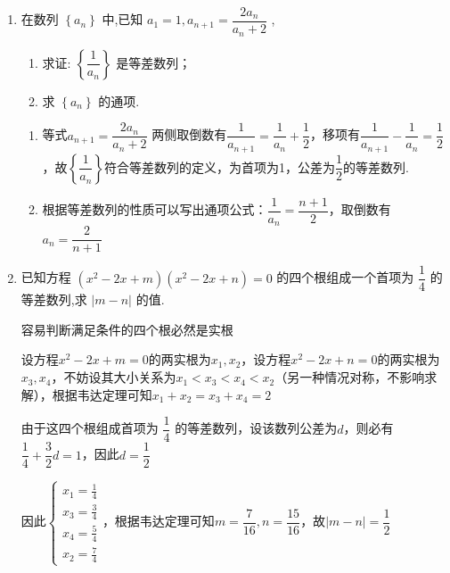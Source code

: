 \begin{enumerate}
    \item 在数列 $\left\{  {a}_{n}\right\}$ 中,已知 $a_1 = 1, a_{n + 1} = \dfrac{2a_n}{a_{n} + 2}$ ,
    \begin{enumerate}
        \item 求证: $\left\{  \dfrac{1}{{a}_{n}}\right\}$ 是等差数列；
        \item 求 $\left\{  {a}_{n}\right\}$ 的通项.
    \end{enumerate}
    \begin{jieda}
        \begin{enumerate}
            \item 等式$a_{n + 1} = \dfrac{2a_n}{a_{n} + 2}$ 两侧取倒数有$\dfrac{1}{a_{n+1}} = \dfrac{1}{a_n} + \dfrac{1}{2}$，移项有$\dfrac{1}{{a}_{n + 1}} - \dfrac{1}{{a}_{n}} = \dfrac{1}{2}$，故$\left\{  \dfrac{1}{{a}_{n}}\right\}$符合等差数列的定义，为首项为1，公差为$\dfrac{1}{2}$的等差数列.
            \item 
            根据等差数列的性质可以写出通项公式：$\dfrac{1}{a_n} = \dfrac{n+1}{2}$，取倒数有${a}_{n} = \dfrac{2}{n + 1}$
            
        \end{enumerate}
    \end{jieda}

    \item 已知方程 $\left( {{x}^{2} - {2x} + m}\right) \left( {{x}^{2} - {2x} + n}\right)  = 0$ 的四个根组成一个首项为 $\dfrac{1}{4}$ 的等差数列,求 $\left| {m - n}\right|$ 的值.
    \begin{jieda}
        容易判断满足条件的四个根必然是实根

        设方程${{x}^{2} - {2x} + m} = 0$的两实根为$x_1, x_2$，设方程${{x}^{2} - {2x} + n} = 0$的两实根为$x_3, x_4$，不妨设其大小关系为$x_1 < x_3 < x_4 < x_2$（另一种情况对称，不影响求解），根据韦达定理可知$x_1+x_2 = x_3+x_4 = 2$

        由于这四个根组成首项为 $\dfrac{1}{4}$ 的等差数列，设该数列公差为$d$，则必有$\dfrac{1}{4} + \dfrac{3}{2}d = 1$，因此$d = \dfrac{1}{2}$

        因此$\left\{\begin{array}{l}
             x_1 = \frac{1}{4}  \\
             x_3 = \frac{3}{4} \\
             x_4 = \frac{5}{4} \\
             x_2 = \frac{7}{4}
        \end{array}\right.$，根据韦达定理可知$m = \dfrac{7}{16}, n = \dfrac{15}{16}$，故$|m-n| = \dfrac{1}{2}$
    \end{jieda}


\end{enumerate}
